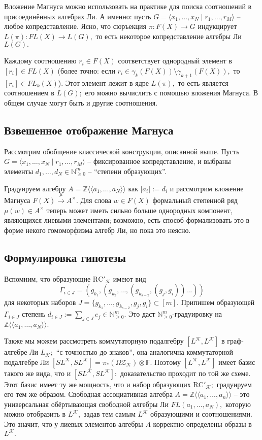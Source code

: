 \documentclass[10pt,a4paper]{article}
\def\ZZ{\mathbb{Z}}
\def\FF{\mathbb{F}}
\def\NN{\mathbb{N}}
\def\Nm{\NN_{\geq 0}^m}
\def\RC{\mathrm{RC}}
\def\Z{\mathcal{Z}}
\def\K{\mathcal{K}}
\def\ZK{\Z_\K}
\def\OZK{\Omega\ZK}
\theoremstyle{definition}
\begin{document}
Вложение Магнуса можно использовать на практике для поиска соотношений в присоединённых алгебрах Ли. А именно: пусть $G=\langle x_1,\dots, x_N\mid r_1,\dots, r_M\rangle$ -- любое копредставление. Ясно, что сюръекция $\pi:F(X)\to G$ индукцирует $L(\pi):FL(X)\to L(G),$ то есть некоторое копредставление алгебры Ли $L(G).$

Каждому соотношению $r_i\in F(X)$ соответствует  однородный элемент в $[r_i]\in FL(X)$ (более точно: если $r_i\in \gamma_k(F(X))\setminus \gamma_{k+1}(F(X)),$ то $[r_i]\in FL_k(X)$). Этот элемент лежит в ядре $L(\pi),$ то есть является соотношением в $L(G);$ его можно вычислить с помощью вложения Магнуса. В общем случае могут быть и другие соотношения.
\subsection{Взвешенное отображение Магнуса}
Рассмотрим обобщение классической конструкции, описанной выше. Пусть $G=\langle x_1,\dots, x_N\mid r_1,\dots, r_M\rangle$ -- фиксированное копредставление, и выбраны элементы $d_1,\dots, d_N\in \Nm$ -- ``степени образующих''.

Градуируем алгебру $A=\ZZ\langle\!\langle a_1,\dots, a_N\rangle\!\rangle$ как $|a_i|:=d_i$ и рассмотрим вложение Магнуса $F(X)\overset{\mu}{\longrightarrow} A^\times.$ Для слова $w\in F(X)$ формальный степенной ряд $\mu(w)\in A^\times$ теперь может иметь сильно больше однородных компонент, являющихся лиевыми элементами; возможно, есть способ формализовать это в форме некого гомоморфизма алгебр Ли, но пока это неясно.
\subsection{Формулировка гипотезы}
Вспомним, что образующие $\RC'_\K$ имеют вид
$$\Gamma_{i\in J}=(g_{k_1},(g_{k_2},\dots,(g_{k_{s-2}},(g_j,g_i))\dots))$$ для некоторых наборов $J=\{g_{k_1},\dots,g_{k_{s-2}},g_j,g_i\}\subset [m].$ Припишем образующей $\Gamma_{i\in J}$ степень $d_{i\in J}:=\sum_{j\in J}e_j\in \Nm.$ Это даст $\Nm$-градуировку на $\ZZ\langle\!\langle a_1,\dots, a_N\rangle\!\rangle.$

Также мы можем рассмотреть коммутаторную подалгебру $[L^\K,L^\K]$ в граф-алгебре Ли $L_\K;$ ``с точностью до знаков'', она аналогична коммутаторной подалгебре Ли $[SL^\K,SL^\K]=\pi_*(\OZK)\otimes\FF.$ Поэтому $[L^\K,L^\K]$ имеет базис такого же вида, что и $[SL^\K,SL^\K]:$ доказательство проходит по той же схеме. Этот базис имеет ту же мощность, что и набор образующих $\RC'_\K;$ градуируем его тем же образом. Свободная ассоциативная алгебра $A=\ZZ\langle\!\langle a_1,\dots, a_n\rangle\!\rangle$ -- это универсальная обёртывающая свободной алгебры Ли $FL(a_1,\dots,a_N),$ которую можно отобразить в $L^\K,$ задав тем самым $L^\K$ образующими и соотношениями. Это значит, что у лиевых элементов алгебры $A$ корректно определены образы в $L^\K.$
\end{document}
